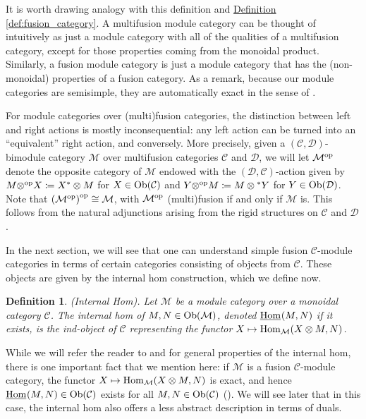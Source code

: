 \documentclass[12pt, reqno]{amsart}
\numberwithin{equation}{section}
\theoremstyle{plainspace}
\theoremstyle{definitionspace}
\newtheorem{definition}[theorem]{Definition}
\theoremstyle{remarkspace}
\newcommand{\mathcat}[1]{\mathcal{#1}}
\newcommand{\Ob}{\textup{Ob}}
\newcommand{\Hom}[2][]{
	\ifthenelse{\equal{#2}{}}
		{\textup{Hom}_{#1}}
		{\textup{Hom}_{#1}\!\left(#2\right)}
}
\newcommand{\IntHom}[2][]{
	\ifthenelse{\equal{#2}{}}
		{\underline{\textup{Hom}}_{#1}}
		{\underline{\textup{Hom}}_{#1}\!\left(#2\right)}
}
\newcommand{\opcat}[1]{{#1}^{\textup{op}}}
\begin{document}
\noindent It is worth drawing analogy with this definition and \hyperref[def:fusion_category]{Definition \ref*{def:fusion_category}}. A multifusion module category can be thought of intuitively as just a module category with all of the qualities of a multifusion category, except for those properties coming from the monoidal product. Similarly, a fusion module category is just a module category that has the (non-monoidal) properties of a fusion category. As a remark, because our module categories are semisimple, they are automatically exact in the sense of \cite[Definition 7.5.1]{Etingof_2016}.
\newline

\noindent For module categories over (multi)fusion categories, the distinction between left and right actions is mostly inconsequential: any left action can be turned into an ``equivalent'' right action, and conversely. More precisely, given a $(\mathcat{C}, \mathcat{D})$-bimodule category $\mathcat{M}$ over multifusion categories $\mathcat{C}$ and $\mathcat{D}$, we will let $\opcat{\mathcat{M}}$ denote the opposite category of $\mathcat{M}$ endowed with the $(\mathcat{D}, \mathcat{C})$-action given by $M \opcat{\otimes} X \coloneqq X^{*} \otimes M$ for $X \in \Ob(\mathcat{C})$ and $Y \opcat{\otimes} M \coloneqq M \otimes {^{*}Y}$ for $Y \in \Ob(\mathcat{D})$. Note that $\opcat{(\opcat{\mathcat{M}})} \cong \mathcat{M}$, with $\opcat{\mathcat{M}}$ (multi)fusion if and only if $\mathcat{M}$ is. This follows from the natural adjunctions arising from the rigid structures on $\mathcat{C}$ and $\mathcat{D}$.
\newline

\noindent In the next section, we will see that one can understand simple fusion $\mathcat{C}$-module categories in terms of certain categories consisting of objects from $\mathcat{C}$. These objects are given by the internal hom construction, which we define now.
\newline

\begin{definition}\label{def:internal_hom}{\em (Internal Hom).} \cite[Definition 3.4]{Ostrik_2003}
Let $\mathcat{M}$ be a module category over a monoidal category $\mathcat{C}$. The {\em internal hom} of $M, N \in \Ob(\mathcat{M})$, denoted $\IntHom{M, N}$ if it exists, is the ind-object of $\mathcat{C}$ representing the functor $X \mapsto \Hom[\mathcat{M}]{X \otimes M, N}$.
\end{definition}
\leavevmode

\noindent While we will refer the reader to \cite[Section 3.2]{Ostrik_2003} and \cite[Section 7.9]{Etingof_2016} for general properties of the internal hom, there is one important fact that we mention here: if $\mathcat{M}$ is a fusion $\mathcat{C}$-module category, the functor $X \mapsto \Hom[\mathcat{M}]{X \otimes M, N}$ is exact, and hence $\IntHom{M, N} \in \Ob(\mathcat{C})$ exists for all $M, N \in \Ob(\mathcat{C})$ (\cite[Remark 3.4]{Ostrik_2003}). We will see later that in this case, the internal hom also offers a less abstract description in terms of duals.
\newline
\end{document}
